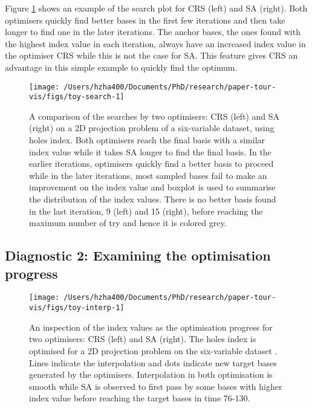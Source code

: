 Figure \ref{fig:toy-search} shows an example of the search plot for CRS
(left) and SA (right). Both optimisers quickly find better bases in the
first few iterations and then take longer to find one in the later
iterations. The anchor bases, the ones found with the highest index
value in each iteration, always have an increased index value in the
optimiser CRS while this is not the case for SA. This feature gives CRS
an advantage in this simple example to quickly find the optimum.

\begin{Schunk}
\begin{figure}

{\centering \texttt{[image: /Users/hzha400/Documents/PhD/research/paper-tour-vis/figs/toy-search-1]} 

}

\caption[A comparison of the searches by two optimisers]{A comparison of the searches by two optimisers: CRS (left) and SA (right) on a 2D projection problem of a six-variable dataset,  using holes index. Both optimisers reach the final basis with a similar index value while it takes SA longer to find the final basis. In the earlier iterations, optimisers quickly find a better basis to proceed while in the later iterations, most sampled bases fail to make an improvement on the index value and boxplot is used to summarise the distribution of the index values. There is no better basis found in the last iteration, 9 (left) and 15 (right), before reaching the maximum number of try and hence it is colored grey.}\label{fig:toy-search}
\end{figure}
\end{Schunk}

\hypertarget{toy-interp}{%
\subsection{Diagnostic 2: Examining the optimisation
progress}\label{toy-interp}}

\begin{Schunk}
\begin{figure}

{\centering \texttt{[image: /Users/hzha400/Documents/PhD/research/paper-tour-vis/figs/toy-interp-1]} 

}

\caption[An inspection of the index values as the optimisation progress for two optimisers]{An inspection of the index values as the optimisation progress for two optimisers: CRS (left) and SA (right). The holes index is optimised for a 2D projection problem on the six-variable dataset . Lines indicate the interpolation and dots indicate new target bases generated by the optimisers. Interpolation in both optimisation is smooth while SA is observed to first pass by some bases with higher index value before reaching the target bases in time 76-130.}\label{fig:toy-interp}
\end{figure}
\end{Schunk}

